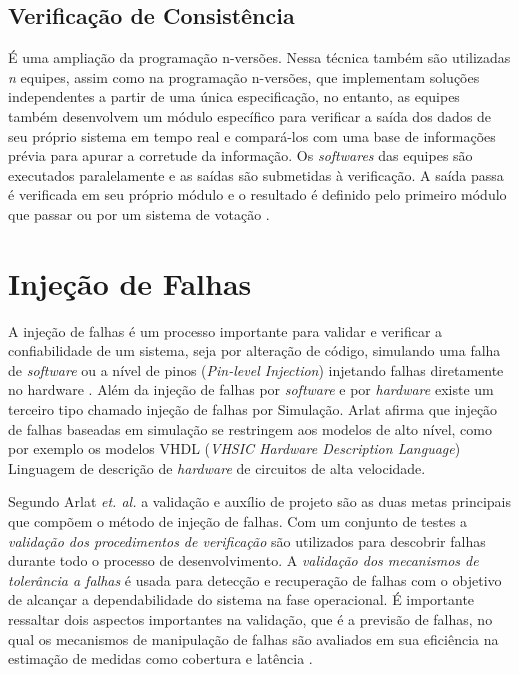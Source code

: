 \documentclass[a4paper,12pt,brazil]{ufms-cpcx}
\begin{document}
\subsection{Verificação de Consistência}

É uma ampliação da programação n-versões. Nessa técnica também são utilizadas \textit{n} equipes, assim como na programação n-versões, que implementam soluções independentes a partir de uma única especificação, no entanto, as equipes também desenvolvem um módulo específico para verificar a saída dos dados de seu próprio sistema em tempo real e compará-los com uma base de informações prévia para apurar a corretude da informação. Os \textit{softwares} das equipes são executados paralelamente e as saídas são submetidas à verificação. A saída passa é verificada em seu próprio módulo e o resultado é definido pelo primeiro módulo que passar ou por um sistema de votação \cite{Nelson:1990,Kruger:2014}.

\section{Injeção de Falhas}

A injeção de falhas é um processo importante para validar e verificar a confiabilidade de um sistema, seja por alteração de código, simulando uma falha de \textit{software} \cite{Kanawati:1995} ou a nível de pinos (\textit{Pin-level Injection}) injetando falhas diretamente no hardware \cite{Arlat:2003}. Além da injeção de  falhas por \textit{software} e por \textit{hardware} existe um terceiro tipo chamado injeção de falhas por Simulação. Arlat \cite{Arlat:2003} afirma que injeção de falhas baseadas em simulação se restringem aos modelos de alto nível, como por exemplo os modelos VHDL (\textit{VHSIC Hardware Description Language}) Linguagem de descrição de \textit{hardware} de circuitos de alta velocidade. 

Segundo Arlat \textit{et. al.} \cite{Arlat:1990} a validação e auxílio de projeto são as duas metas principais que compõem o método de injeção de falhas. Com um conjunto de testes a \textit{validação dos procedimentos de verificação} são utilizados para descobrir falhas durante todo o processo de desenvolvimento. A \textit{validação dos mecanismos de tolerância a falhas} é usada para detecção e recuperação de falhas com o objetivo de alcançar a dependabilidade do sistema na fase operacional. É importante ressaltar dois aspectos importantes na validação, que é a previsão de falhas, no qual os mecanismos de manipulação de falhas são avaliados em sua eficiência na estimação de medidas como cobertura e latência \cite{Arlat:1990}.
\end{document}

